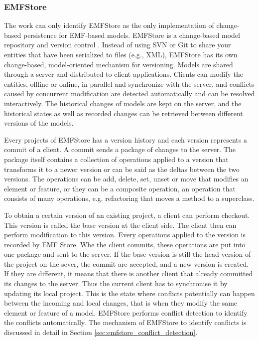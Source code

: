 \subsubsection{EMFStore}
\label{sec:emfstore}
The work can only identify EMFStore \cite{koegel2010emfstore} as the only implementation of change-based persistence for EMF-based models. EMFStore is a change-based model repository and version control \cite{emfstore2019what}. Instead of using SVN or Git to share your entities that have been serialized to files (e.g., XML), EMFStore has its own change-based, model-oriented mechanism for versioning. Models are shared through a server and distributed to client applications. Clients can modify the entities, offline or online, in parallel and synchronize with the server, and conflicts caused by concurrent modification are detected automatically and can be resolved interactively. The historical changes of models are kept on the server, and the historical states as well as recorded changes can be retrieved between different versions of the models. 

Every projects of EMFStore has a version history and each version represents a commit of a client. A commit sends a package of changes to the server. The package itself contains a collection of operations applied to a version that transforms it to a newer version or can be said as the deltas between the two versions. The operations can be add, delete, set, unset or move that modifies an element or feature, or they can be a composite operation, an operation that consists of many operations, e.g. refactoring that moves a method to a superclass. 

To obtain a certain version of an existing project, a client can perform checkout. This version is called the base version at the client side. The client then can perform modification to this version. Every operations applied to the version is recorded by EMF Store. Whe the client commits, these operations are put into one package and sent to the server. If the base version is still the head version of the project on the sever, the commit are accepted, and a new version is created. If they are different, it means that there is another client that already committed its changes to the server. Thus the current client has to synchronise it by updating its local project. This is the state where conflicts potentially can happen between the incoming and local changes, that is when they modify the same element or feature of a model. EMFStore performs conflict detection to identify the conflicts automatically. The mechanism of EMFStore to identify conflicts is discussed in detail in Section \ref{sec:emfstore_conflict_detection}.  

